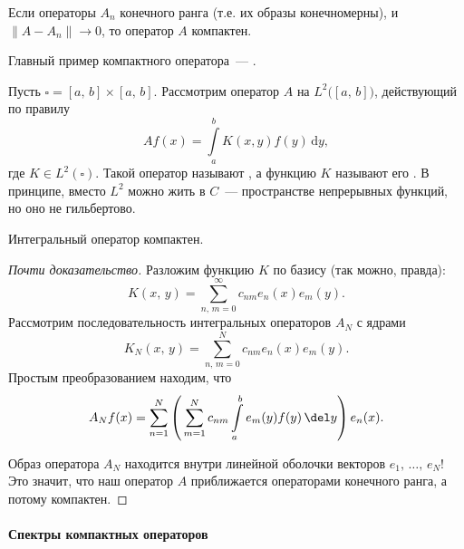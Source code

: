 \documentclass{trlnotes}
\begin{document}
    \begin{cor}
        Если операторы $A_n$ конечного ранга (т.е. их образы конечномерны), и $\|A - A_n\| \to 0$, то оператор $A$ компактен.
    \end{cor}

    Главный пример компактного оператора~--- .

    \begin{exm}
        Пусть $\square = [a, \, b] \times [a, \, b]$. Рассмотрим оператор $A$ на $L^2\big([a, \, b]\big)$, действующий по правилу
        \[
            Af(x) = \int\limits_a^b K(x, y) f(y) \, \mathrm{d}y,
        \]
        где $K \in L^2(\square)$. Такой оператор называют , а функцию $K$ называют его . В принципе, вместо $L^2$ можно жить в $C$~--- пространстве непрерывных функций, но оно не гильбертово.   
    \end{exm}

    \begin{st}
        Интегральный оператор компактен.
        \begin{proof}[Почти доказательство]
            Разложим функцию $K$ по базису (так можно, правда):
            \[
                K(x, \, y) = \sum\limits_{n, \, m = 0}^{\infty} c_{nm} e_n(x) e_m(y).
            \]
            Рассмотрим последовательность интегральных операторов $A_N$ с ядрами
            \[
                K_N(x, \, y) = \sum\limits_{n, \, m = 0}^{N} c_{nm} e_n(x) e_m(y).
            \]
            Простым преобразованием находим, что
            \[
                A_N f(x) = \sum\limits_{n = 1}^N \left(\,\sum\limits_{m = 1}^N c_{nm} \int\limits_a^b e_m(y) f(y) \, \del y\right) e_n(x).
            \]

            Образ оператора $A_N$ находится внутри линейной оболочки векторов $e_1, \, \ldots, \, e_N$! Это значит, что наш оператор $A$ приближается операторами конечного ранга, а потому компактен.
        \end{proof}
    \end{st}

    \paragraph{Спектры компактных операторов}

    
\end{document}
